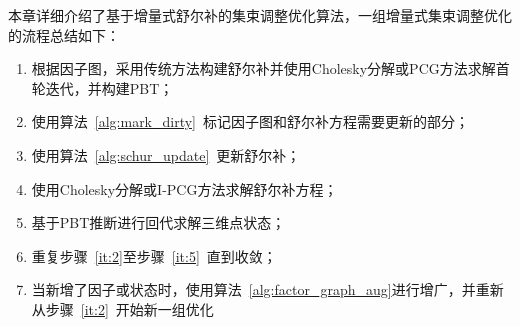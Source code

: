 本章详细介绍了基于增量式舒尔补的集束调整优化算法，一组增量式集束调整优化的流程总结如下：
\begin{enumerate}
    \item 根据因子图，采用传统方法构建舒尔补并使用Cholesky分解或PCG方法求解首轮迭代，并构建PBT；
    \item\label{it:2} 使用算法~\ref{alg:mark_dirty}~标记因子图和舒尔补方程需要更新的部分；
    \item\label{it:3} 使用算法~\ref{alg:schur_update}~更新舒尔补；
    \item\label{it:4} 使用Cholesky分解或I-PCG方法求解舒尔补方程；
    \item\label{it:5} 基于PBT推断进行回代求解三维点状态；
    \item 重复步骤~\ref{it:2}至步骤~\ref{it:5}~直到收敛；
    \item 当新增了因子或状态时，使用算法~\ref{alg:factor_graph_aug}进行增广，并重新从步骤~\ref{it:2}~开始新一组优化
\end{enumerate}
